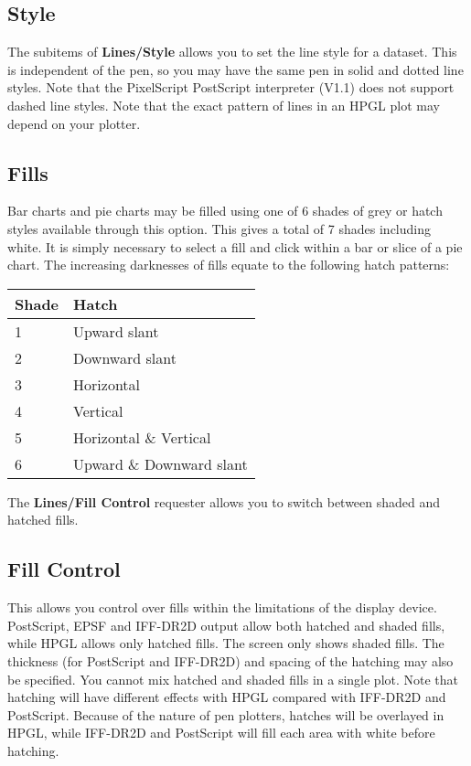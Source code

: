\documentclass{report}
\begin{document}
\subsection{Style}
The subitems of {\bf Lines/Style}  allows you to set the line 
style for a dataset. This is independent 
of the pen, so you may have the same pen in solid and dotted line styles. Note 
that the PixelScript PostScript interpreter (V1.1) does not support dashed line 
styles. Note that the exact pattern of lines in an HPGL plot may depend on your 
plotter.


\subsection{Fills}
\label{ss:fill}
Bar charts  and pie charts  may be filled 
using one of 6 shades of grey or hatch styles available 
through this option. This gives a total of 7 shades including white. It is simply 
necessary to select a fill and click within a bar or slice of a pie chart. The 
increasing darknesses  of fills equate to the following hatch patterns:
\begin{center}
\begin{tabular}{|l|l|} \hline
Shade &  Hatch                      \\ \hline
1     &  Upward slant               \\
2     &  Downward slant             \\
3     &  Horizontal                 \\
4     &  Vertical                   \\
5     &  Horizontal \& Vertical     \\
6     &  Upward \& Downward slant   \\ \hline
\end{tabular}
\end{center}
The {\bf Lines/Fill Control} requester allows you to switch between shaded and 
hatched fills.


\subsection{Fill Control}
This allows you control over fills within the 
limitations of the display 
device. PostScript, EPSF and IFF-DR2D output allow both hatched and 
shaded fills, while HPGL allows only hatched fills. The screen only shows 
shaded fills. The thickness (for PostScript and IFF-DR2D) and spacing of 
the hatching may also be specified. You cannot mix hatched and shaded fills in a 
single plot. Note that hatching will have different effects with HPGL compared with 
IFF-DR2D and PostScript. Because of the nature of pen plotters, hatches will be 
overlayed in HPGL, while IFF-DR2D and PostScript will fill each area with white 
before hatching.
\end{document}
